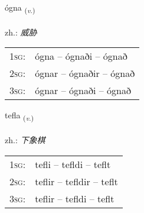\documentclass[frontgrid, backgrid]{flacards}\usepackage[]{graphicx}\usepackage[]{xcolor}
\begin{document}
\renewcommand{\flhead}{\vskip5pt \fboxsep=0pt {\small\bfseries\footnotesize Sagnorð | 动词}}
\renewcommand{\fcfoot}{\vskip5pt \fboxsep=0pt \hspace{2pt}{\small\bfseries\footnotesize 3K}}

\renewcommand{\blhead}{\vskip5pt {\small\bfseries\footnotesize Sagnorð | 动词 }}
\renewcommand{\bcfoot}{\vskip5pt \hspace{2pt}{\small\bfseries\footnotesize 3K}}


{ógna \small{\textsubscript{(\textit{v.})}} \\[1ex] %
\textphonetic{[oukna]} \\
zh.: \emph{威胁} \\  [2ex]
\renewcommand*{\arraystretch}{0.8}
\begin{tabular}{p{1cm}l}
\textsc{1sg}: & ógna -- ógnaði -- ógnað \\ 
\textsc{2sg}: & ógnar -- ógnaðir -- ógnað \\ 
\textsc{3sg}: & ógnar -- ógnaði -- ógnað \\ 
\end{tabular}
}

\renewcommand{\flhead}{\vskip5pt \fboxsep=0pt {\small\bfseries\footnotesize Sagnorð | 动词}}
\renewcommand{\fcfoot}{\vskip5pt \fboxsep=0pt \hspace{2pt}{\small\bfseries\footnotesize 3K}}

\renewcommand{\blhead}{\vskip5pt {\small\bfseries\footnotesize Sagnorð | 动词 }}
\renewcommand{\bcfoot}{\vskip5pt \hspace{2pt}{\small\bfseries\footnotesize 3K}}


{tefla \small{\textsubscript{(\textit{v.})}} \\[1ex] %
\textphonetic{[tʰɛpla]} \\
zh.: \emph{下象棋} \\  [2ex]
\renewcommand*{\arraystretch}{0.8}
\begin{tabular}{p{1cm}l}
\textsc{1sg}: & tefli -- tefldi -- teflt \\ 
\textsc{2sg}: & teflir -- tefldir -- teflt \\ 
\textsc{3sg}: & teflir -- tefldi -- teflt \\ 
\end{tabular}
}
\end{document}
